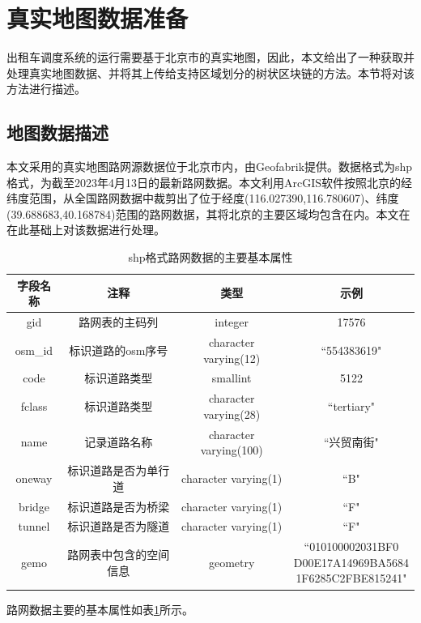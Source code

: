 \section{真实地图数据准备}

\space 出租车调度系统的运行需要基于北京市的真实地图，因此，本文给出了一种获取并处理真实地图数据、并将其上传给支持区域划分的树状区块链的方法。本节将对该方法进行描述。

\subsection{地图数据描述}
本文采用的真实地图路网源数据位于北京市内，由Geofabrik提供。数据格式为shp格式，为截至2023年4月13日的最新路网数据。本文利用ArcGIS软件按照北京的经纬度范围，从全国路网数据中裁剪出了位于经度(116.027390,116.780607)、纬度(39.688683,40.168784)范围的路网数据，其将北京的主要区域均包含在内。本文在在此基础上对该数据进行处理。

\begin{table}[ht]
    \linespread{1.5}
    \centering
    \caption{shp格式路网数据的主要基本属性}
    \label{mapDataProperty}
    \begin{tabular}{cccc}
    \toprule
    字段名称 & 注释 & 类型 & 示例     \\ 
    \hline
    gid & 路网表的主码列 & integer & 17576 \\
    osm\_id & 标识道路的osm序号 & character varying(12) & ``554383619" \\
    code & 标识道路类型 & smallint & 5122 \\
    fclass & 标识道路类型 & character varying(28) & ``tertiary" \\
    name & 记录道路名称 & character varying(100) & ``兴贸南街" \\
    oneway & 标识道路是否为单行道 & character varying(1) & ``B" \\
    bridge & 标识道路是否为桥梁 & character varying(1) & ``F" \\
    tunnel & 标识道路是否为隧道 & character varying(1) & ``F" \\ 
    gemo & 路网表中包含的空间信息 & geometry & \makecell{``010100002031BF0\\D00E17A14969BA5684\\1F6285C2FBE815241"} \\
    \bottomrule
    \end{tabular}
\end{table}
路网数据主要的基本属性如表\ref{mapDataProperty}所示。


